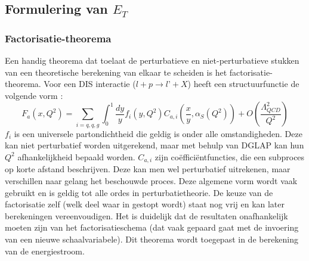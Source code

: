 \documentclass[a4paper,11pt]{article}
\numberwithin{equation}{section} %
\begin{document}
  \subsection{Formulering van $E_T$}
    \subsubsection{Factorisatie-theorema} \label{sec:FactorisatieTheorema}
Een handig theorema dat toelaat de perturbatieve en niet-perturbatieve stukken van een  theoretische berekening van elkaar te scheiden is het factorisatie-theorema.
Voor een DIS interactie ($l+p\rightarrow l’+X$) heeft een structuurfunctie de volgende vorm \cite{Martin}: 
\begin{equation}
F_a(x, Q^2) = \sum_{i=q,q,g} \int_0^1 \frac{dy}{y} f_i(y, Q^2) C_{a,i} \left( \frac{x}{y},\alpha_S(Q^2) \right) + O \left( \frac{\Lambda_{QCD}^2}{Q^2} \right) 
\end{equation}
$f_i$ is een universele partondichtheid die geldig is onder alle omstandigheden.
Deze kan niet perturbatief worden uitgerekend, maar met behulp van DGLAP kan hun $Q^2$ afhankelijkheid bepaald worden.
$C_{a,i}$ zijn coëfficiëntfuncties, die een subproces op korte afstand beschrijven.
Deze kan men wel perturbatief uitrekenen, maar verschillen naar gelang het beschouwde proces.
Deze algemene vorm wordt vaak gebruikt en is geldig tot alle ordes in perturbatietheorie.
De keuze van de factorisatie zelf (welk deel waar in gestopt wordt) staat nog vrij en kan later berekeningen vereenvoudigen.
Het is duidelijk dat de resultaten onafhankelijk moeten zijn van het factorisatieschema (dat vaak gepaard gaat met de invoering van een nieuwe schaalvariabele).
Dit theorema wordt toegepast in de berekening van de energiestroom.
\end{document}
